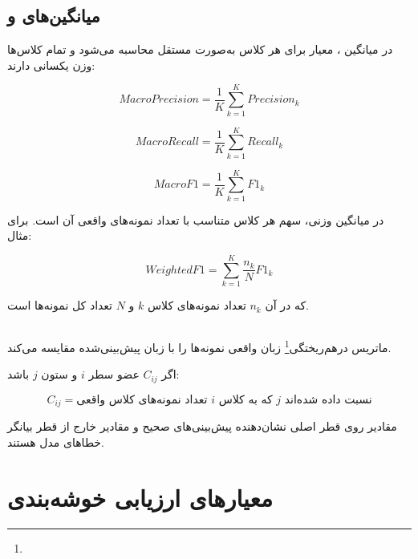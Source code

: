 \documentclass[12pt,a4paper,oneside]{report}
\begin{document}
\subsection{میانگین‌های  و }

در میانگین
،
معیار برای هر کلاس به‌صورت مستقل محاسبه می‌شود و تمام کلاس‌ها وزن یکسانی دارند:

\begin{equation}
MacroPrecision
=
\frac{1}{K}
\sum_{k=1}^{K}Precision_k
\end{equation}

\begin{equation}
MacroRecall
=
\frac{1}{K}
\sum_{k=1}^{K}Recall_k
\end{equation}

\begin{equation}
MacroF1
=
\frac{1}{K}
\sum_{k=1}^{K}
F1_k
\end{equation}

در میانگین وزنی، سهم هر کلاس متناسب با تعداد نمونه‌های واقعی آن است. برای مثال:

\begin{equation}
WeightedF1
=
\sum_{k=1}^{K}
\frac{n_k}{N}F1_k
\end{equation}

که در آن $n_k$ تعداد نمونه‌های کلاس $k$ و $N$ تعداد کل نمونه‌ها است.


\subsection{}

ماتریس درهم‌ریختگی\footnote{} زبان واقعی نمونه‌ها را با زبان پیش‌بینی‌شده مقایسه می‌کند.

اگر $C_{ij}$ عضو سطر $i$ و ستون $j$ باشد:

\begin{equation}
C_{ij}
=
\text{تعداد نمونه‌های کلاس واقعی }i
\text{ که به کلاس }j
\text{ نسبت داده شده‌اند}
\end{equation}

مقادیر روی قطر اصلی نشان‌دهنده پیش‌بینی‌های صحیح و مقادیر خارج از قطر بیانگر خطاهای مدل هستند.


\section{معیارهای ارزیابی خوشه‌بندی}
\end{document}
